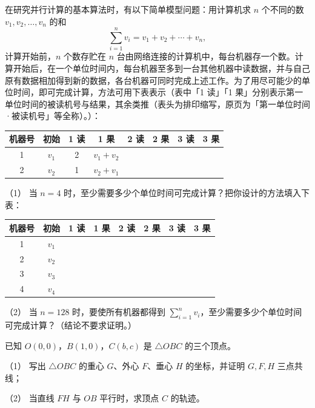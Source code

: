 \begin{question}
在研究并行计算的基本算法时，有以下简单模型问题：用计算机求 \(n\) 个不同的数 \(v_1,v_2,\ldots,v_n\) 的和
\nopagebreak[4]
\[
\sum_{i=1}^n v_i=v_1+v_2+\cdots+v_n,
\]
计算开始前，\(n\) 个数存贮在 \(n\) 台由网络连接的计算机中，每台机器存一个数。计算开始后，在一个单位时间内，每台机器至多到一台其他机器中读数据，并与自己原有数据相加得到新的数据，各台机器可同时完成上述工作。为了用尽可能少的单位时间，即可完成计算，方法可用下表表示（表中「1 读」「1 果」分别表示第一单位时间的被读机号与结果，其余类推（表头为排印缩写，原页为「第一单位时间·被读机号」等全称）。）：

\begin{center}
\begingroup\setlength{\tabcolsep}{4pt}
\begin{tabular}{cccccccc}
\toprule
机器号 & 初始 & 1 读 & 1 果 & 2 读 & 2 果 & 3 读 & 3 果 \\
\midrule
1 & \(v_1\) & 2 & \(v_1+v_2\) &  &  &  &  \\
2 & \(v_2\) & 1 & \(v_2+v_1\) &  &  &  &  \\
\bottomrule
\end{tabular}
\endgroup
\end{center}

（1） 当 \(n=4\) 时，至少需要多少个单位时间可完成计算？把你设计的方法填入下表：

\begin{center}
\begingroup\setlength{\tabcolsep}{4pt}
\begin{tabular}{cccccccc}
\toprule
机器号 & 初始 & 1 读 & 1 果 & 2 读 & 2 果 & 3 读 & 3 果 \\
\midrule
1 & \(v_1\) &  &  &  &  &  &  \\
2 & \(v_2\) &  &  &  &  &  &  \\
3 & \(v_3\) &  &  &  &  &  &  \\
4 & \(v_4\) &  &  &  &  &  &  \\
\bottomrule
\end{tabular}
\endgroup
\end{center}

（2） 当 \(n=128\) 时，要使所有机器都得到 \(\sum_{i=1}^{n}v_i\)，至少需要多少个单位时间可完成计算？（结论不要求证明。）

\end{question}
\begin{question}
已知 \(O(0,0)\)，\(B(1,0)\)，\(C(b,c)\) 是 \(\triangle OBC\) 的三个顶点。

（1） 写出 \(\triangle OBC\) 的重心 \(G\)、外心 \(F\)、垂心 \(H\) 的坐标，并证明 \(G,F,H\) 三点共线；

（2） 当直线 \(FH\) 与 \(OB\) 平行时，求顶点 \(C\) 的轨迹。

\end{question}
